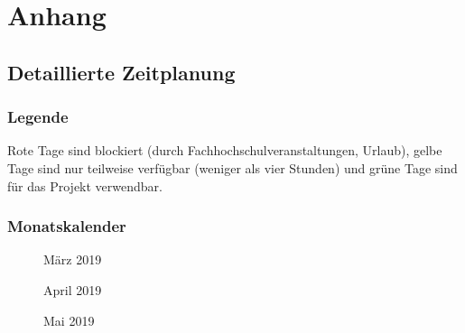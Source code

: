 \section{Anhang}

\subsection{Detaillierte Zeitplanung}
\label{app:Zeitplanung}

\subsubsection{Legende}
\label{app:Legende}
Rote Tage sind blockiert (\zB durch Fachhochschulveranstaltungen, Urlaub), gelbe Tage sind nur teilweise verfügbar (weniger als vier Stunden) und grüne Tage sind für das Projekt verwendbar. \\

\subsubsection{Monatskalender}
\label{app:Monatskalender}
\begin{figure}[htb]
    \centering
    \caption{März 2019}
\end{figure}
\begin{figure}[htb]
    \centering
    \caption{April 2019}
\end{figure}
\begin{figure}[htb]
    \centering
    \caption{Mai 2019}
\end{figure}

\clearpage

